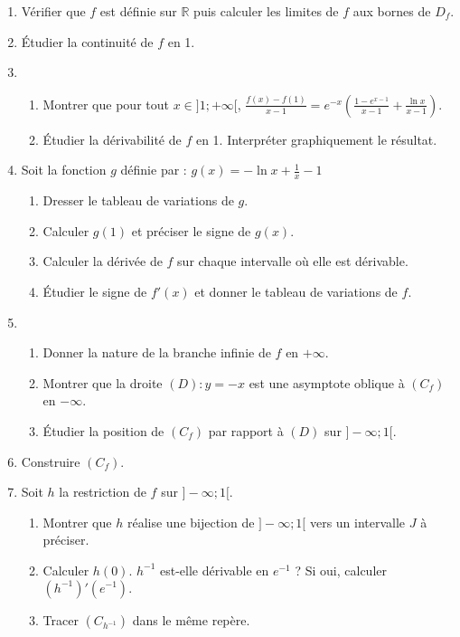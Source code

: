 \documentclass[12pt,a4paper]{article}
\begin{document}
\begin{enumerate}
    \item Vérifier que \( f \) est définie sur \( \mathbb{R} \) puis calculer les limites de \( f \) aux bornes de \( D_f \).
    \item Étudier la continuité de \( f \) en 1.
    \item
          \begin{enumerate}
              \item Montrer que pour tout \( x \in ]1;+\infty[ \),
                    \( \frac{f(x) - f(1)}{x - 1} = e^{-x} \left( \frac{1 - e^{x-1}}{x - 1} + \frac{\ln x}{x - 1} \right). \)
              \item Étudier la dérivabilité de \( f \) en 1. Interpréter graphiquement le résultat.
          \end{enumerate}
    \item Soit la fonction \( g \) définie par : \( g(x) = - \ln x + \frac{1}{x} - 1 \)
          \begin{enumerate}
              \item Dresser le tableau de variations de \( g \).
              \item Calculer \( g(1) \) et préciser le signe de \( g(x) \).
              \item Calculer la dérivée de \( f \) sur chaque intervalle où elle est dérivable.
              \item Étudier le signe de \( f'(x) \) et donner le tableau de variations de \( f \).
          \end{enumerate}
    \item
          \begin{enumerate}
              \item Donner la nature de la branche infinie de \( f \) en \( +\infty \).
              \item Montrer que la droite \( (D) : y = -x \) est une asymptote oblique à \( (C_f) \) en \( -\infty \).
              \item Étudier la position de \( (C_f) \) par rapport à \( (D) \) sur \( ]-\infty;1[ \).
          \end{enumerate}
    \item Construire \( (C_f) \).
    \item Soit \( h \) la restriction de \( f \) sur \( ]-\infty;1[ \).
          \begin{enumerate}
              \item Montrer que \( h \) réalise une bijection de \( ]-\infty;1[ \) vers un intervalle \( J \) à préciser.
              \item Calculer \( h(0) \).
                    \( h^{-1} \) est-elle dérivable en \( e^{-1} \) ? Si oui, calculer  \( (h^{-1})'(e^{-1}). \)
              \item Tracer \( (C_{h^{-1}}) \) dans le même repère.
          \end{enumerate}
\end{enumerate}
\end{document}
